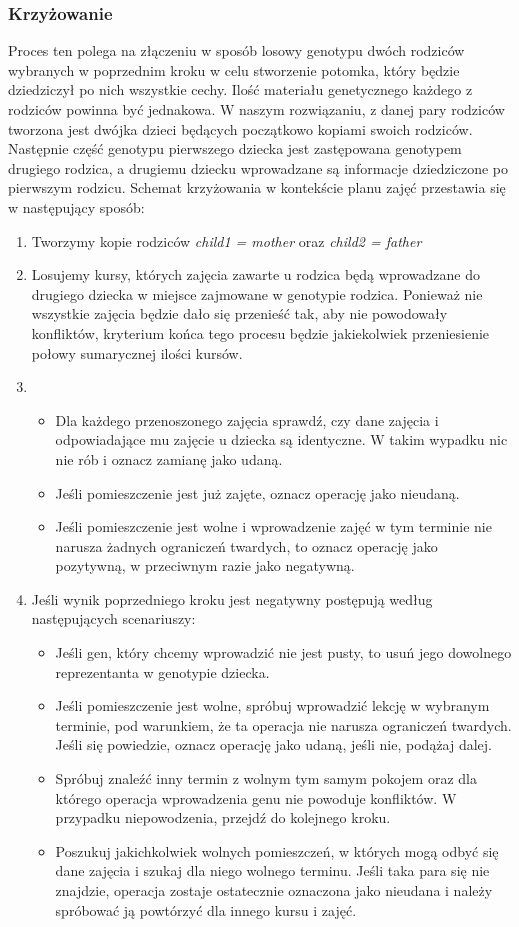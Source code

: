 \subsubsection{Krzyżowanie}
Proces ten polega na złączeniu w sposób losowy genotypu dwóch rodziców wybranych w poprzednim kroku w celu stworzenie potomka, który będzie dziedziczył po nich wszystkie cechy. Ilość materiału genetycznego każdego z rodziców powinna być jednakowa. W naszym rozwiązaniu, z danej pary rodziców tworzona jest dwójka dzieci będących początkowo kopiami swoich rodziców. Następnie część genotypu pierwszego dziecka jest zastępowana genotypem drugiego rodzica, a drugiemu dziecku wprowadzane są informacje dziedziczone po pierwszym rodzicu. Schemat krzyżowania w kontekście planu zajęć przestawia się w następujący sposób:
\begin{enumerate}
\item Tworzymy kopie rodziców \emph{child1 = mother} oraz \emph{child2 = father}
\item Losujemy kursy, których zajęcia zawarte u rodzica będą wprowadzane do drugiego dziecka w miejsce zajmowane w genotypie rodzica. Ponieważ nie wszystkie zajęcia będzie dało się przenieść tak, aby nie powodowały konfliktów, kryterium końca tego procesu będzie jakiekolwiek przeniesienie połowy sumarycznej ilości kursów.
\item 
\begin{itemize}
\item Dla każdego przenoszonego zajęcia sprawdź, czy dane zajęcia i odpowiadające mu zajęcie u dziecka są identyczne. W takim wypadku nic nie rób i oznacz zamianę jako udaną.
\item Jeśli pomieszczenie jest już zajęte, oznacz operację jako nieudaną.
\item Jeśli pomieszczenie jest wolne i wprowadzenie zajęć w tym terminie nie narusza żadnych ograniczeń twardych, to oznacz operację jako pozytywną, w przeciwnym razie jako negatywną.
\end{itemize}
\item Jeśli wynik poprzedniego kroku jest negatywny postępują według następujących scenariuszy:
\begin{itemize}
\item Jeśli gen, który chcemy wprowadzić nie jest pusty, to usuń jego dowolnego reprezentanta w genotypie dziecka.
\item Jeśli pomieszczenie jest wolne, spróbuj wprowadzić lekcję w wybranym terminie, pod warunkiem, że ta operacja nie narusza ograniczeń twardych. Jeśli się powiedzie, oznacz operację jako udaną, jeśli nie, podążaj dalej.
\item Spróbuj znaleźć inny termin z wolnym tym samym pokojem oraz dla którego operacja wprowadzenia genu nie powoduje konfliktów. W przypadku niepowodzenia, przejdź do kolejnego kroku.
\item Poszukuj jakichkolwiek wolnych pomieszczeń, w których mogą odbyć się dane zajęcia i szukaj dla niego wolnego terminu. Jeśli taka para się nie znajdzie, operacja zostaje ostatecznie oznaczona jako nieudana i należy spróbować ją powtórzyć dla innego kursu i zajęć.
\end{itemize}
\end{enumerate}
